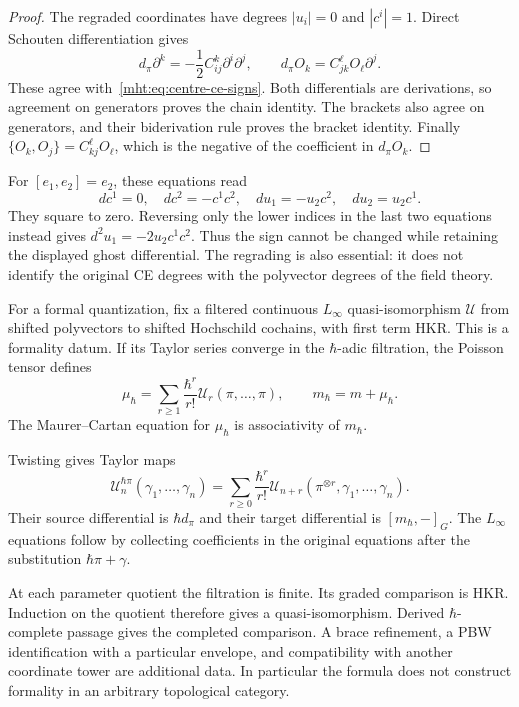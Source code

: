 \begin{proof}
The regraded coordinates have degrees $|u_i|=0$ and $|c^i|=1$.
Direct Schouten differentiation gives
\[
 d_\pi\partial^k=-\frac12C^k_{ij}\partial^i\partial^j,
 \qquad d_\pi O_k=C^\ell_{jk}O_\ell\partial^j.
\]
These agree with~\eqref{mht:eq:centre-ce-signs}. Both differentials
are derivations, so agreement on generators proves the chain
identity. The brackets also agree on generators, and their
biderivation rule proves the bracket identity. Finally
$\{O_k,O_j\}=C^\ell_{kj}O_\ell$, which is the negative of the
coefficient in $d_\pi O_k$.
\end{proof}

For $[e_1,e_2]=e_2$, these equations read
\[
 dc^1=0,\quad dc^2=-c^1c^2,\quad
 du_1=-u_2c^2,\quad du_2=u_2c^1.
\]
They square to zero. Reversing only the lower indices in the last
two equations instead gives $d^2u_1=-2u_2c^1c^2$. Thus the sign
cannot be changed while retaining the displayed ghost differential.
The regrading is also essential: it does not identify the original
CE degrees with the polyvector degrees of the field theory.

For a formal quantization, fix a filtered continuous
$L_\infty$ quasi-isomorphism $\mathcal U$ from shifted polyvectors
to shifted Hochschild cochains, with first term HKR. This is a
formality datum. If its Taylor series converge in the
$\hbar$-adic filtration, the Poisson tensor defines
\[
 \mu_\hbar=\sum_{r\geq1}\frac{\hbar^r}{r!}
                   \mathcal U_r(\pi,\ldots,\pi),
 \qquad m_\hbar=m+\mu_\hbar.
\]
The Maurer--Cartan equation for $\mu_\hbar$ is associativity of
$m_\hbar$. 

Twisting gives Taylor maps
\[
 \mathcal U^{\hbar\pi}_n(\gamma_1,\ldots,\gamma_n)
 =\sum_{r\geq0}\frac{\hbar^r}{r!}
   \mathcal U_{n+r}(\pi^{\otimes r},\gamma_1,\ldots,\gamma_n).
\]
Their source differential is $\hbar d_\pi$ and their target
differential is $[m_\hbar,-]_G$. The $L_\infty$ equations follow
by collecting coefficients in the original equations after the
substitution $\hbar\pi+\gamma$.

At each parameter quotient the filtration is finite. Its graded
comparison is HKR. Induction on the quotient therefore gives a
quasi-isomorphism. Derived $\hbar$-complete passage gives the
completed comparison. A brace refinement, a PBW identification
with a particular envelope, and compatibility with another
coordinate tower are additional data. In particular the formula
does not construct formality in an arbitrary topological category.

